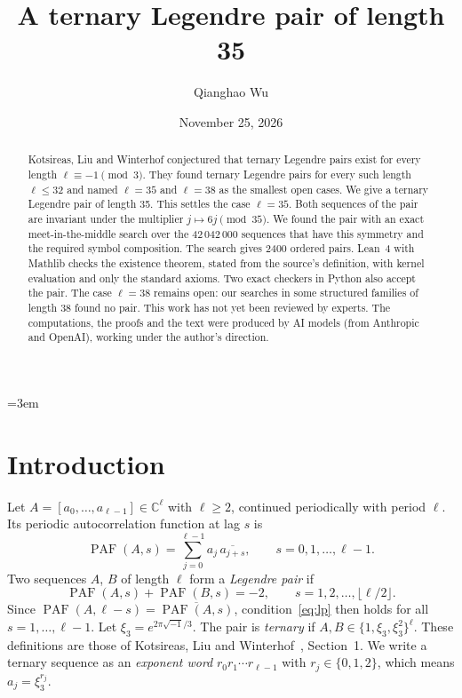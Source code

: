 \documentclass[11pt]{article}
\title{A ternary Legendre pair of length 35}
\author{Qianghao Wu}
\date{November 25, 2026}
\theoremstyle{remark}
\newcommand{\PAF}{\operatorname{PAF}}
\begin{document}
\emergencystretch=3em
\maketitle

\begin{abstract}
Kotsireas, Liu and Winterhof conjectured that ternary Legendre pairs exist for every length $\ell \equiv -1 \pmod 3$. They found ternary Legendre pairs for every such length $\ell \le 32$ and named $\ell = 35$ and $\ell = 38$ as the smallest open cases. We give a ternary Legendre pair of length 35. This settles the case $\ell = 35$. Both sequences of the pair are invariant under the multiplier $j \mapsto 6j \pmod{35}$. We found the pair with an exact meet-in-the-middle search over the 42\,042\,000 sequences that have this symmetry and the required symbol composition. The search gives 2400 ordered pairs. Lean~4 with Mathlib checks the existence theorem, stated from the source's definition, with kernel evaluation and only the standard axioms. Two exact checkers in Python also accept the pair. The case $\ell = 38$ remains open: our searches in some structured families of length 38 found no pair. This work has not yet been reviewed by experts. The computations, the proofs and the text were produced by AI models (from Anthropic and OpenAI), working under the author's direction.
\end{abstract}

\section{Introduction}

Let $A = [a_0, \dots, a_{\ell-1}] \in \mathbb{C}^\ell$ with $\ell \ge 2$, continued periodically with period $\ell$. Its periodic autocorrelation function at lag $s$ is
\[
  \PAF(A, s) = \sum_{j=0}^{\ell-1} a_j \, \overline{a_{j+s}}, \qquad s = 0, 1, \dots, \ell - 1 .
\]
Two sequences $A$, $B$ of length $\ell$ form a \emph{Legendre pair} if
\begin{equation}\label{eq:lp}
  \PAF(A, s) + \PAF(B, s) = -2, \qquad s = 1, 2, \dots, \lfloor \ell/2 \rfloor .
\end{equation}
Since $\PAF(A, \ell - s) = \overline{\PAF(A, s)}$, condition~\eqref{eq:lp} then holds for all $s = 1, \dots, \ell - 1$. Let $\xi_3 = e^{2\pi\sqrt{-1}/3}$. The pair is \emph{ternary} if $A, B \in \{1, \xi_3, \xi_3^2\}^\ell$. These definitions are those of Kotsireas, Liu and Winterhof~\cite{KLW}, Section~1. We write a ternary sequence as an \emph{exponent word} $r_0 r_1 \cdots r_{\ell-1}$ with $r_j \in \{0, 1, 2\}$, which means $a_j = \xi_3^{r_j}$.
\end{document}

